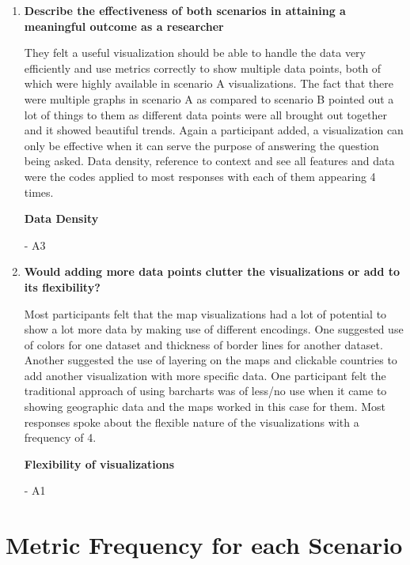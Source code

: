 \documentclass[double,12pt]{beavtex}
\begin{document}
\begin{enumerate}
\item \textbf{Describe the effectiveness of both scenarios in attaining a meaningful outcome as a researcher}

They felt a useful visualization should be able to handle the data very efficiently and use metrics correctly to show multiple data points, both of which were highly available in scenario A visualizations. The fact that there were multiple graphs in scenario A as compared to scenario B pointed out a lot of things to them as different data points were all brought out together and it showed beautiful trends. Again a participant added, a visualization can only be effective when it can serve the purpose of answering the question being asked. Data density, reference to context and see all features and data were the codes applied to most responses with each of them appearing 4 times.

\textbf{Data Density}

{\em {}} - A3

\item \textbf{Would adding more data points clutter the visualizations or add to its flexibility?}

Most participants felt that the map visualizations had a lot of potential to show a lot more data by making use of different encodings. One suggested use of colors for one dataset and thickness of border lines for another dataset. Another suggested the use of layering on the maps and clickable countries to add another visualization with more specific data. One participant felt the traditional approach of using barcharts was of less/no use when it came to showing geographic data and the maps worked in this case for them. Most responses spoke about the flexible nature of the visualizations with a frequency of 4.

\textbf{Flexibility of visualizations}

{\em {}} - A1
\end{enumerate}
\section{Metric Frequency for each Scenario}
\end{document}
